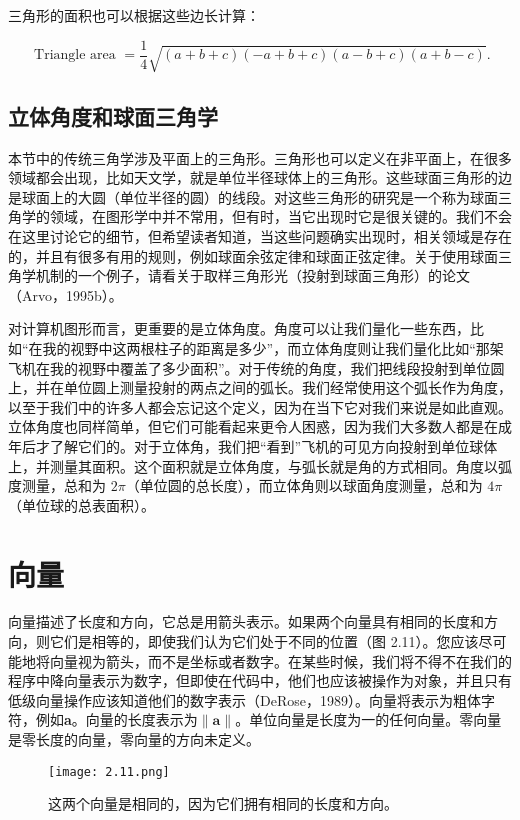 \documentclass[lang=cn,12pt]{elegantbook}
\begin{document}
三角形的面积也可以根据这些边长计算：

$$
\text { Triangle area }=\frac{1}{4} \sqrt{(a+b+c)(-a+b+c)(a-b+c)(a+b-c)} .
$$

\subsection{立体角度和球面三角学}

本节中的传统三角学涉及平面上的三角形。三角形也可以定义在非平面上，在很多领域都会出现，比如天文学，就是单位半径球体上的三角形。这些球面三角形的边是球面上的大圆（单位半径的圆）的线段。对这些三角形的研究是一个称为球面三角学的领域，在图形学中并不常用，但有时，当它出现时它是很关键的。我们不会在这里讨论它的细节，但希望读者知道，当这些问题确实出现时，相关领域是存在的，并且有很多有用的规则，例如球面余弦定律和球面正弦定律。关于使用球面三角学机制的一个例子，请看关于取样三角形光（投射到球面三角形）的论文（Arvo，1995b）。

对计算机图形而言，更重要的是立体角度。角度可以让我们量化一些东西，比如“在我的视野中这两根柱子的距离是多少”，而立体角度则让我们量化比如“那架飞机在我的视野中覆盖了多少面积”。对于传统的角度，我们把线段投射到单位圆上，并在单位圆上测量投射的两点之间的弧长。我们经常使用这个弧长作为角度，以至于我们中的许多人都会忘记这个定义，因为在当下它对我们来说是如此直观。立体角度也同样简单，但它们可能看起来更令人困惑，因为我们大多数人都是在成年后才了解它们的。对于立体角，我们把“看到”飞机的可见方向投射到单位球体上，并测量其面积。这个面积就是立体角度，与弧长就是角的方式相同。角度以弧度测量，总和为 $2\pi$（单位圆的总长度），而立体角则以球面角度测量，总和为 $4\pi$（单位球的总表面积）。

\section{向量}
向量描述了长度和方向，它总是用箭头表示。如果两个向量具有相同的长度和方向，则它们是相等的，即使我们认为它们处于不同的位置（图 2.11）。您应该尽可能地将向量视为箭头，而不是坐标或者数字。在某些时候，我们将不得不在我们的程序中降向量表示为数字，但即使在代码中，他们也应该被操作为对象，并且只有低级向量操作应该知道他们的数字表示（DeRose，1989）。向量将表示为粗体字符，例如\textbf{a}。向量的长度表示为$\|\mathbf{a}\|$。单位向量是长度为一的任何向量。零向量是零长度的向量，零向量的方向未定义。

\begin{figure}[htbp]
\centering
\texttt{[image: 2.11.png]}
\caption{这两个向量是相同的，因为它们拥有相同的长度和方向。}
\end{figure}
\end{document}
